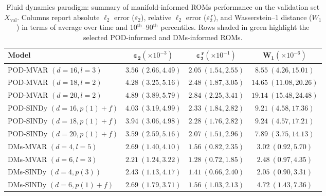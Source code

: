 \documentclass{article}
\begin{document}
\begin{table}[ht]
\centering
\setlength{\tabcolsep}{2pt}
{
\small
\begin{tabularx}{\textwidth}{lCCC}  
\toprule
\textbf{Model} & $\boldsymbol{\varepsilon_2} (\times 10^{-3})$ & $\boldsymbol{\varepsilon_2^{\,r}} (\times 10^{-1})$ & $\boldsymbol{W_1}  (\times 10^{-6})$ \\
\midrule
{} 
POD-MVAR $(d=16, l=3)$ & $3.56~(2.66,4.49)$ & $2.05~(1.54,2.55)$ & $8.55~(4.26,15.01)$\\

POD-MVAR $(d=18, l=2)$ & $4.28~(3.25,5.16)$ & $2.48~(1.87,3.05)$ & $14.65~(11.08,20.26)$\\

POD-MVAR $(d=20, l=2)$ & $4.89~(3.89,5.79)$ & $2.84~(2.25,3.41)$ & $19.14~(15.48,24.48)$\\

POD-SINDy $(d=16,p(1) + f)$ & $4.03~(3.19,4.99)$ & $2.33~(1.84,2.82)$ & $9.21~(4.58,17.36)$\\

POD-SINDy $(d=18,p(1) + f)$ & $3.94~(3.06,4.98)$ & $2.28~(1.76,2.82)$ & $9.24~(4.57,17.21)$\\

POD-SINDy $(d=20,p(1) + f)$ & $3.59~(2.59,5.16)$ & $2.07~(1.51,2.96)$ & $7.89~(3.75,14.13)$\\


DMs-MVAR $(d=4, l=5)$ & $2.69~(1.40,4.10)$ & $1.56~(0.82,2.35)$ & $3.02~(0.92,5.70)$\\

DMs-MVAR $(d=6, l=3)$ & $2.21~(1.24,3.22)$ & $1.28~(0.72,1.85)$ & $2.48~(0.97,4.35)$\\


DMs-SINDy $(d=4, p(3))$ & $2.43~(1.13,4.17)$ & $1.41~(0.66,2.40)$ & $2.05~(0.90,3.31)$\\

DMs-SINDy $(d=6, p(1) + f)$ & $2.69~(1.79,3.71)$ & $1.56~(1.03,2.13)$ & $4.72~(1.43,7.36)$\\

\bottomrule
\end{tabularx}
}
\caption{Fluid dynamics paradigm: summary of manifold-informed ROMs performance on the validation set \(X_{\text{val}}\). Columns report absolute $\ell_2$ error ($\varepsilon_2$), relative $\ell_2$ error ($\varepsilon_2^{\,r}$), and Wasserstein–1 distance ($W_1$) in terms of average over time and 10$^{\text{th}}$–90$^{\text{th}}$ percentiles. Rows shaded in green highlight the selected POD-informed and DMs-informed ROMs.}
\label{tab:rom_metrics_validation_new}
\end{table}
\end{document}
